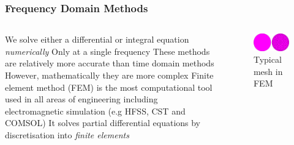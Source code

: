 \documentclass[10pt]{beamer}
\begin{document}
\begin{frame}
    \frametitle{Frequency Domain Methods}
    \begin{columns}[T] %
        \begin{column}{.6\textwidth}
            \begin{outline}
                \1 We solve either a differential or integral equation \textit{numerically}
                \2 Only at a single frequency
                \1 These methods are relatively more accurate than time domain methods
                \2 However, mathematically they are more complex
                \1 Finite element method (FEM) is the most computational tool used in all areas of engineering including electromagnetic simulation (e.g HFSS, CST and COMSOL)
                \2 It solves partial differential equations by discretisation into \textit{finite elements}
            \end{outline}
        \end{column}
        \begin{column}{.4\textwidth}
            \begin{figure}[B!]
                \centering
                \includegraphics[width=1\textwidth]{mesh.pdf}
                \caption{Typical mesh in FEM}
            \end{figure}
        \end{column}%
    \end{columns}

\end{frame}
\end{document}

